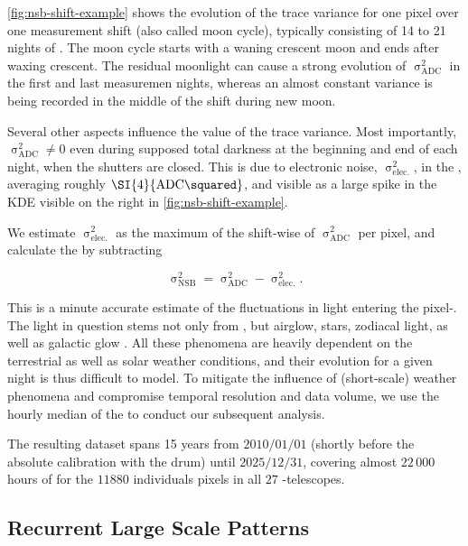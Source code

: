 \cref{fig:nsb-shift-example} shows the evolution of the trace variance for one 
pixel over one \FD measurement shift (also called moon cycle), typically 
consisting of 14 to 21 nights of \DAQ. The moon cycle starts with a waning 
crescent moon and ends after waxing crescent. The residual moonlight can cause 
a strong evolution of $\upsigma^2_\mathrm{ADC}$ in the first and last measuremen 
nights, whereas an almost constant variance is being recorded in the middle of 
the \FD shift during new moon.

Several other aspects influence the value of the trace variance. Most 
importantly, $\upsigma^2_\mathrm{ADC}\neq0$ even during supposed total darkness 
at the beginning and end of each \DAQ night, when the \FD shutters are closed. 
This is due to electronic noise, $\upsigma^2_\mathrm{elec.}$, in the \PMTs, 
averaging roughly $\SI{4}{\mathrm{ADC}\squared}$, and visible as a large spike 
in the \acf{KDE} visible on the right in \cref{fig:nsb-shift-example}.

We estimate $\upsigma^2_\mathrm{elec.}$ as the maximum of the shift-wise \KDE of 
$\upsigma^2_\mathrm{ADC}$ per pixel, and calculate the \NSB by subtracting

\begin{equation}
\label{eq:night-sky-background}
\upsigma^2_\mathrm{NSB} = \upsigma^2_\mathrm{ADC} - \upsigma^2_\mathrm{elec.}.
\end{equation}

This \NSB is a minute accurate estimate of the fluctuations in light entering 
the pixel-\PMTs. The light in question stems not only from \EASs, but
airglow, stars, zodiacal light, as well as galactic glow 
\cite{GAP2016_005CrossCheck}. All these phenomena are heavily dependent on the 
terrestrial as well as solar weather conditions, and their evolution for a 
given night is thus difficult to model. To mitigate the influence of 
(short-scale) weather phenomena and compromise temporal resolution and data 
volume, we use the hourly median of the \NSB to conduct our subsequent 
analysis. 

The resulting dataset spans 15 years from $2010/01/01$ (shortly before the 
absolute calibration with the drum) until $2025/12/31$, covering almost 
$22\,000$ hours of \DAQ for the $11880$ individuals pixels in all $27$ 
\FD-telescopes. 

\subsection{Recurrent Large Scale Patterns}
\label{ssec:large-scale-patterns}

